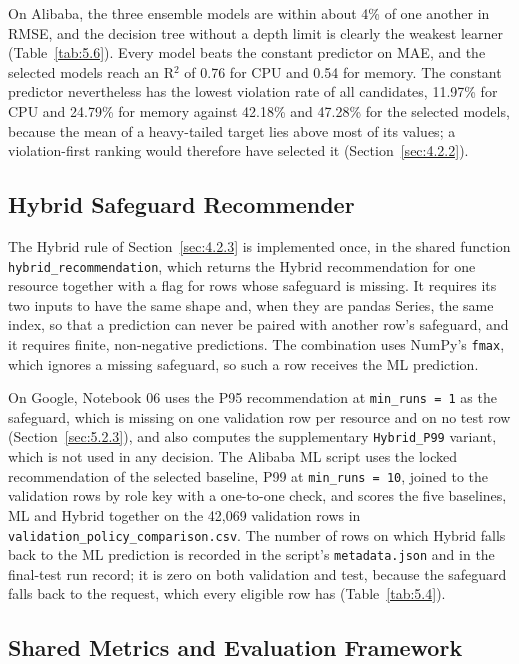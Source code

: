 On Alibaba, the three ensemble models are within about 4\% of one another in RMSE, and the decision tree without a depth limit is clearly the weakest learner (Table~\ref{tab:5.6}). Every model beats the constant predictor on MAE, and the selected models reach an R$^{2}$ of 0.76 for CPU and 0.54 for memory. The constant predictor nevertheless has the lowest violation rate of all candidates, 11.97\% for CPU and 24.79\% for memory against 42.18\% and 47.28\% for the selected models, because the mean of a heavy-tailed target lies above most of its values; a violation-first ranking would therefore have selected it (Section~\ref{sec:4.2.2}).

\subsection{Hybrid Safeguard Recommender}\label{sec:5.4}

The Hybrid rule of Section~\ref{sec:4.2.3} is implemented once, in the shared function \texttt{hybrid\_recommendation}, which returns the Hybrid recommendation for one resource together with a flag for rows whose safeguard is missing. It requires its two inputs to have the same shape and, when they are pandas Series, the same index, so that a prediction can never be paired with another row's safeguard, and it requires finite, non-negative predictions. The combination uses NumPy's \texttt{fmax}, which ignores a missing safeguard, so such a row receives the ML prediction.

On Google, Notebook 06 uses the P95 recommendation at \texttt{min\_runs\ =\ 1} as the safeguard, which is missing on one validation row per resource and on no test row (Section~\ref{sec:5.2.3}), and also computes the supplementary \texttt{Hybrid\_P99} variant, which is not used in any decision. The Alibaba ML script uses the locked recommendation of the selected baseline, P99 at \texttt{min\_runs\ =\ 10}, joined to the validation rows by role key with a one-to-one check, and scores the five baselines, ML and Hybrid together on the 42,069 validation rows in \texttt{validation\_policy\_comparison.csv}. The number of rows on which Hybrid falls back to the ML prediction is recorded in the script's \texttt{metadata.json} and in the final-test run record; it is zero on both validation and test, because the safeguard falls back to the request, which every eligible row has (Table~\ref{tab:5.4}).

\subsection{Shared Metrics and Evaluation Framework}\label{sec:5.5}

